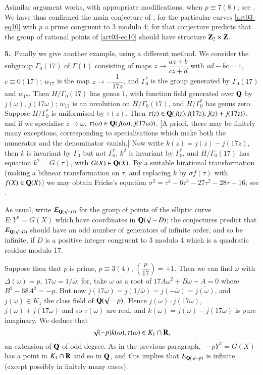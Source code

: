 A\pageoriginale similar argument works, with appropriate modifications, when $p\equiv 7(8)$; see \cite{art03-key5}. We have thus confirmed the main conjecture of \cite{art03-key2}, for the particular curves \eqref{art03-eq10} with $p$ a prime congruent to 3 modulo 4; for that conjecture predicts that the group of rational points of \eqref{art03-eq10} should have structure $\mathbf{Z}_{2}\times \mathbf{Z}$.

\medskip
\noindent
{\bf 5.}~Finally we give another example, using a different method. We consider the subgroup $\Gamma_{0}(17)$ of $\Gamma(1)$ consisting of maps $z\to \dfrac{az+b}{cz+d}$ with $ad-bc=1$, $c\equiv 0(17)$; $w_{17}$ is the map $z\to -\dfrac{1}{17z}$, and $\Gamma^{*}_{0}$ is the group generated by $\Gamma_{0}(17)$ and $w_{17}$. Then $H/\Gamma_{0}(17)$ has genus $1$, with function field generated over $\mathbf{Q}$ by $j(\omega)$, $j(17\omega)$; $w_{17}$ is an involution on $H/\Gamma_{0}(17)$, and $H/\Gamma^{*}_{0}$ has genus zero. Suppose $H/\Gamma^{*}_{0}$ is uniformised by $\tau(z)$. Then $\tau(z)\in \mathbf{Q}(j(z).j(17z),j(z)+j(17z))$, and if we specialise $z\to \omega$, $\tau(\omega)\in \mathbf{Q}(j(\omega),j(17\omega))$. [A priori, there may be finitely many exceptions, corresponding to specialisations which make both the numerator and the denominator vanish.] Now write $k(z)=j(z)-j(17z)$, then $k$ is invariant by $\Gamma_{0}$ but not $\Gamma^{*}_{0}$, $k^{2}$ is invariant by $\Gamma^{*}_{0}$, and $H/\Gamma_{0}(17)$ has equation $k^{2}=G(\tau)$, with $G(X)\in \mathbf{Q}(X)$. By a suitable birational transformation (making a bilinear transformation on $\tau$, and replacing $k$ by $\sigma f(\tau)$ with $f(X)\in \mathbf{Q}(X)$) we may obtain Fricke's equation $\sigma^{2}=\tau^{4}-6\tau^{3}-27\tau^{2}-28\tau-16$; see \cite{art03-key4}.

As usual, write $E_{\mathbf{Q}(\surd -D)}$ for the group of points of the elliptic curve $E:Y^{2}=G(X)$ which have coordinates in $\mathbf{Q}(\surd-D)$; the conjectures predict that $E_{\mathbf{Q}(\surd-D)}$ should have an odd number of generators of infinite order, and so be infinite, if $D$ is a positive integer congruent to 3 modulo 4 which is a quadratic residue modulo 17.

Suppose then that $p$ is prime, $p\equiv 3(4)$, $\left(\dfrac{p}{17}\right)=+1$. Then we can find $\omega$ with $\Delta(\omega)=p$, $17\omega=1/\overline{\omega}$; for, take $\omega$ as a root of $17A\omega^{2}+B\omega+A=0$ where $B^{2}-68A^{2}=-p$. But now $j(17\omega)=j(1/\overline{\omega})=j(-\overline{\omega})=\overline{j(\omega)}$, and $j(\omega)\in K_{1}$ the class field of $\mathbf{Q}(\surd-p)$. Hence $j(\omega)\cdot j(17\omega)$, $j(\omega)+j(17\omega)$ and so $\tau(\omega)$ are real, and $k(\omega)=j(\omega)-j(17\omega)$ is pure imaginary. We deduce that
$$
\surd (-p)k(\omega),\tau(\omega)\in K_{1}\cap \mathbf{R},
$$\pageoriginale
an extension of $\mathbf{Q}$ of odd degree. As in the previous paragraph, ${}-pY^{2}=G(X)$ has a point in $K_{1}\cap \mathbf{R}$ and so in $\mathbf{Q}$, and this implies that $E_{\mathbf{Q}(\surd-p)}$ is infinite (except possibly in finitely many cases).

